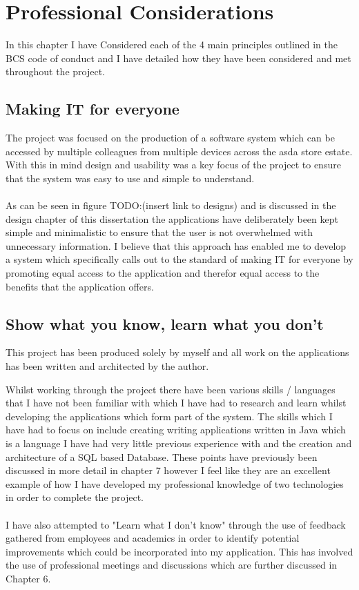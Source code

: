 \documentclass[a4paper,11pt]{report}
\begin{document}
\chapter{Professional Considerations}

In this chapter I have Considered each of the 4 main principles outlined in the BCS code of conduct and I have detailed how they have been considered and met throughout the project. 

\section{Making IT for everyone}
The project was focused on the production of a software system which can be accessed by multiple colleagues from multiple devices across the asda store estate.
 With this in mind design and usability was a key focus of the project to ensure that the system was easy to use and simple to understand. 
 \\
 \\
 As can be seen in figure TODO:(insert link to designs) and is discussed in the design chapter of this dissertation the applications have deliberately been kept simple and minimalistic to ensure that the user is not overwhelmed with unnecessary information.
  I believe that this approach has enabled me to develop a system which specifically calls out to the standard of making IT for everyone by promoting equal access to the application and therefor equal access to the benefits that the application offers. 
\section{Show what you know, learn what you don't}
This project has been produced solely by myself and all work on the applications has been written and architected by the author. 

Whilst working through the project there have been various skills / languages that I have not been familiar with which I have had
to research and learn whilst developing the applications which form part of the system. The skills which I have had to focus on include
creating writing applications written in Java which is a language I have had very little previous experience with and the creation and architecture of a SQL based Database.
These points have previously been discussed in more detail in chapter 7 however I feel like they are an excellent example of how 
I have developed my professional knowledge of two technologies in order to complete the project.
\\
\\
I have also attempted to "Learn what I don't know" through the use of feedback gathered from employees and academics 
in order to identify potential improvements which could be incorporated into my application. 
This has involved the use of professional meetings and discussions which are further discussed in Chapter 6.
\end{document}
